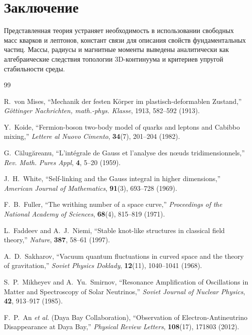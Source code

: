 \documentclass[12pt,a4paper]{article}
\begin{document}
	\section*{Заключение}
	Представленная теория устраняет необходимость в использовании свободных масс кварков и лептонов, констант связи для описания свойств фундаментальных частиц. Массы, радиусы и магнитные моменты выведены аналитически как алгебраические следствия топологии 3D-континуума и критериев упругой стабильности среды.
	
	\begin{thebibliography}{99}
		
		R.~von Mises, 
		``Mechanik der festen Körper im plastisch-deformablen Zustand,''
		\textit{Göttinger Nachrichten, math.-phys. Klasse}, 1913, 582--592 (1913).
		
		Y.~Koide, 
		``Fermion-boson two-body model of quarks and leptons and Cabibbo mixing,''
		\textit{Lettere al Nuovo Cimento}, \textbf{34}(7), 201--204 (1982).
		
		G.~Călugăreanu,
		``L'intégrale de Gauss et l'analyse des nœuds tridimensionnels,''
		\textit{Rev. Math. Pures Appl}, \textbf{4}, 5--20 (1959).
		
		J.~H.~White, 
		``Self-linking and the Gauss integral in higher dimensions,''
		\textit{American Journal of Mathematics}, \textbf{91}(3), 693--728 (1969).
		
		F.~B.~Fuller,
		``The writhing number of a space curve,''
		\textit{Proceedings of the National Academy of Sciences}, \textbf{68}(4), 815--819 (1971).
		
		L.~Faddeev and A.~J.~Niemi, 
		``Stable knot-like structures in classical field theory,''
		\textit{Nature}, \textbf{387}, 58--61 (1997).
		
		A.~D.~Sakharov, 
		``Vacuum quantum fluctuations in curved space and the theory of gravitation,''
		\textit{Soviet Physics Doklady}, \textbf{12}(11), 1040--1041 (1968).
		
		S.~P.~Mikheyev and A.~Yu.~Smirnov,
		``Resonance Amplification of Oscillations in Matter and Spectroscopy of Solar Neutrinos,''
		\textit{Soviet Journal of Nuclear Physics}, \textbf{42}, 913--917 (1985).
		
		F.~P.~An \textit{et al.} (Daya Bay Collaboration),
		``Observation of Electron-Antineutrino Disappearance at Daya Bay,''
		\textit{Physical Review Letters}, \textbf{108}(17), 171803 (2012).
		

\end{thebibliography}
\end{document}
